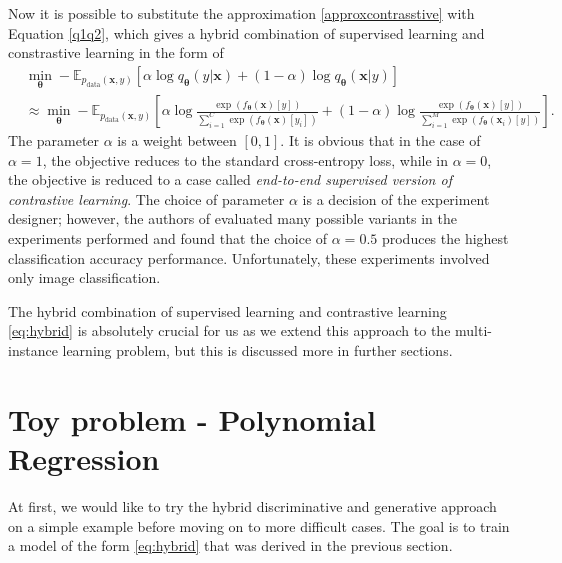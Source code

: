 Now it is possible to substitute the approximation \eqref{approxcontrasstive} with Equation \eqref{q1q2}, which gives a hybrid combination of supervised learning and constrastive learning in the form of
\begin{align}\label{eq:q1q2final}
	&\min_{\boldsymbol{\theta}}- \mathbb{E}_{p_{\mathrm{data}}(\boldsymbol{x},y)}\left[\alpha\log q_{\boldsymbol{\theta}}\left(y|\boldsymbol{x}\right)+ \left(1-\alpha\right)\log q_{\boldsymbol{\theta}}\left(\boldsymbol{x}|y\right) \right]  \\
	&\label{eq:hybrid}\approx	\min_{\boldsymbol{\theta}}- \mathbb{E}_{p_{\mathrm{data}}(\boldsymbol{x},y)}\left[\alpha\log \frac{\exp\left({f_{\boldsymbol{\theta}}\left(\boldsymbol{x}\right)[y]}\right)}{\sum_{i=1}^C\exp\left({f_{\boldsymbol{\theta}}\left(\boldsymbol{x}\right)[y_i]}\right)}+ \left(1-\alpha\right)\log \frac{\exp\left({f_{\boldsymbol{\theta}}\left(\boldsymbol{x}\right)[y]}\right)}{\sum_{i=1}^M\exp\left({f_{\boldsymbol{\theta}}\left(\boldsymbol{x}_i\right)[y]}\right)} \right]. 
\end{align}
The parameter $\alpha$ is a weight between $\left[0,1\right]$. It is obvious that in the case of $\alpha = 1$, the objective reduces to the standard cross-entropy loss, while in $\alpha = 0$, the objective is reduced to a case called \emph{end-to-end supervised version of contrastive learning}. The choice of parameter $\alpha$ is a decision of the experiment designer; however, the authors of \cite{HDGEmain} evaluated many possible variants in the experiments performed and found that the choice of $\alpha=0.5$ produces the highest classification accuracy performance. Unfortunately, these experiments involved only image classification. 

The hybrid combination of supervised learning and contrastive learning \eqref{eq:hybrid} is absolutely crucial for us as we extend this approach to the multi-instance learning problem, but this is discussed more in further sections.  


\section{Toy problem - Polynomial Regression}
At first, we would like to try the hybrid discriminative and generative approach on a simple example before moving on to more difficult cases. The goal is to train a model of the form \eqref{eq:hybrid} that was derived in the previous section.

